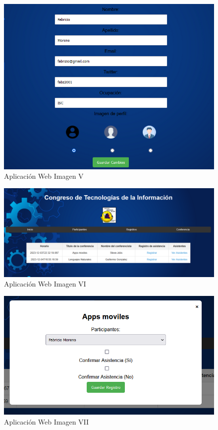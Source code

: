 \begin{figure}[H]
	\centering
	\includegraphics[width=1\linewidth]{Imagenes/web5}
	\caption{Aplicación Web Imagen V}
	\label{fig:web5}
\end{figure}

\begin{figure}[H]
	\centering
	\includegraphics[width=1\linewidth]{Imagenes/web6}
	\caption{Aplicación Web Imagen VI}
	\label{fig:web6}
\end{figure}

\begin{figure}[H]
	\centering
	\includegraphics[width=1\linewidth]{Imagenes/web7}
	\caption{Aplicación Web Imagen VII}
	\label{fig:web7}
\end{figure}

